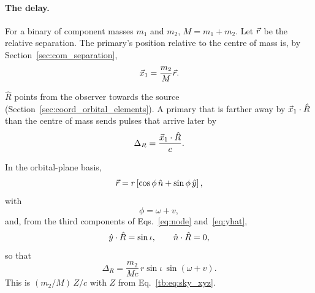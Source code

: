 	\paragraph{The delay.} For a binary of component masses $m_1$ and $m_2$, $M=m_1+m_2$. Let $\vec r$ be the relative separation. The primary's position relative to the centre of mass is, by Section~\ref{sec:com_separation},
	\begin{equation}
		\vec x_1
		=
		\frac{m_2}{M}\vec r .
	\end{equation}
	
	$\hat R$ points from the observer towards the source (Section~\ref{sec:coord_orbital_elements}). A primary that is farther away by $\vec x_1\cdot\hat R$ than the centre of mass sends pulses that arrive later by
	\begin{equation}
		\Delta_R
		=
		\frac{\vec x_1\cdot\hat R}{c}.
	\end{equation}
	
	In the orbital-plane basis,
	\begin{equation}
		\vec r
		=
		r
		\left[
		\cos\phi\,\hat n+\sin\phi\,\hat y
		\right],
	\end{equation}
	with
	\begin{equation}
		\phi=\omega+v,
	\end{equation}
	and, from the third components of Eqs.~\eqref{eq:node} and~\eqref{eq:yhat},
	\begin{equation}
		\hat y\cdot\hat R=\sin\iota,
		\qquad
		\hat n\cdot\hat R=0,
	\end{equation}
	so that
	\begin{equation}
		\Delta_R
		=
		\frac{m_2}{Mc}\,
		r\sin\iota\,\sin(\omega+v).
	\end{equation}
	This is $(m_2/M)\,Z/c$ with $Z$ from Eq.~\eqref{tb:eq:sky_xyz}.
	
